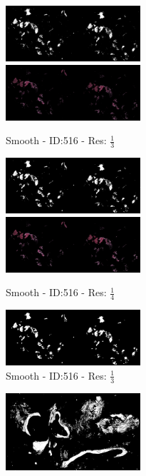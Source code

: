 \documentclass[letterpaper,10pt,oneside]{article}
\begin{document}
\begin{figure}[hbtp]
  \begin{subfigure}[b]{5cm}
    \includegraphics[width=5cm]{visualization/results/smoothhistogram/res_reduce_3/Region_0_PO13-00516A1_1_7_201305171148.png}
    \includegraphics[width=5cm]{visualization/results/smoothhistogram/res_reduce_3/Region_1_PO13-00516A1_1_7_201305171148.png}
    \caption{Smooth - ID:516 - Res: $\frac{1}{3}$}
  \end{subfigure}
  \begin{subfigure}[b]{5cm}
    \includegraphics[width=5cm]{visualization/results/smoothhistogram/res_reduce_4/Region_0_PO13-00516A1_1_7_201305171148.png}
    \includegraphics[width=5cm]{visualization/results/smoothhistogram/res_reduce_4/Region_1_PO13-00516A1_1_7_201305171148.png}
    \caption{Smooth - ID:516 - Res: $\frac{1}{4}$}
  \end{subfigure}
  \begin{subfigure}[b]{5cm}
    \includegraphics[width=5cm]{visualization/results/smoothhistogram/res_reduce_5/Region_0_PO13-00516A1_1_7_201305171148.png}
    \caption{Smooth - ID:516 - Res: $\frac{1}{3}$}
  \end{subfigure}
  \begin{subfigure}[b]{5cm}
    \includegraphics[width=5cm]{visualization/results/smoothhistogram/res_reduce_3/Region_0_PO13-00522A1_1_2_201305171639.png}

\end{subfigure}
\end{figure}
\end{document}
